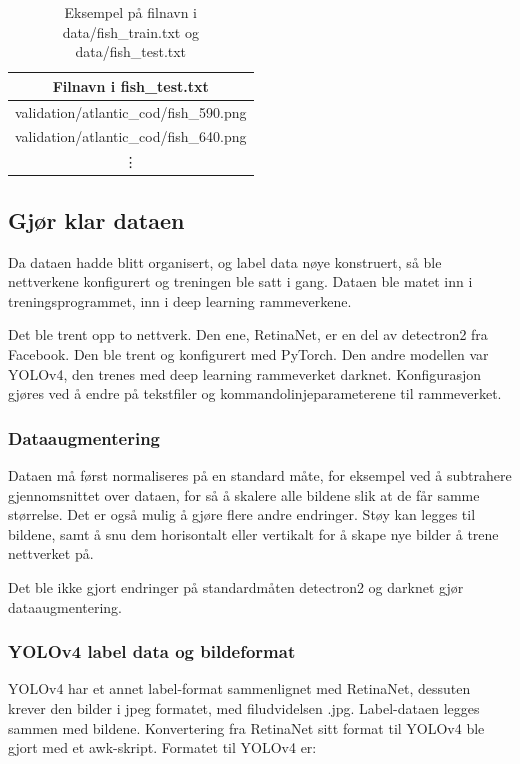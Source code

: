 \begin{table}[b]
\bigskip
\centering
\caption{Eksempel på filnavn i data/fish\_train.txt og data/fish\_test.txt}
\label{tab:fish} 
\begin{tabular}[t]{c}
\toprule
Filnavn i fish\_test.txt \\
\midrule
validation/atlantic\_cod/fish\_590.png \\
validation/atlantic\_cod/fish\_640.png \\
\vdots \\
\bottomrule	
\end{tabular}
\end{table}

\subsection{Gjør klar dataen}

Da dataen hadde blitt organisert, og label data nøye konstruert, så ble nettverkene konfigurert og treningen ble satt i gang. Dataen ble matet inn i treningsprogrammet, inn i deep learning rammeverkene.

Det ble trent opp to nettverk. Den ene, RetinaNet, er en del av detectron2 fra Facebook. Den ble trent og konfigurert med PyTorch. Den andre modellen var YOLOv4, den trenes med deep learning rammeverket darknet. Konfigurasjon gjøres ved å endre på tekstfiler og kommandolinjeparameterene til rammeverket.

\subsubsection{Dataaugmentering}

Dataen må først normaliseres på en standard måte, for eksempel ved å subtrahere gjennomsnittet over dataen, for så å skalere alle bildene slik at de får samme størrelse. Det er også mulig å gjøre flere andre endringer. Støy kan legges til bildene, samt å snu dem horisontalt eller vertikalt for å skape nye bilder å trene nettverket på.

Det ble ikke gjort endringer på standardmåten detectron2 og darknet gjør dataaugmentering.

\subsubsection{YOLOv4 label data og bildeformat}

YOLOv4 har et annet label-format sammenlignet med RetinaNet, dessuten krever den bilder i jpeg formatet, med filudvidelsen .jpg. Label-dataen legges sammen med bildene. Konvertering fra RetinaNet sitt format til YOLOv4 ble gjort med et awk-skript. Formatet til YOLOv4 er:

